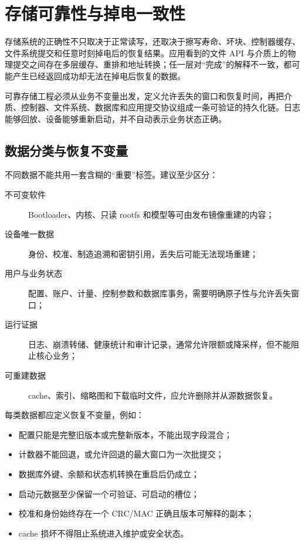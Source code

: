 \chapter{存储可靠性与掉电一致性}
\label{chap:storage-reliability}

存储系统的正确性不只取决于正常读写，还取决于擦写寿命、坏块、控制器缓存、文件系统提交和任意时刻掉电后的恢复结果。应用看到的文件 API 与介质上的物理提交之间存在多层缓存、重排和地址转换；任一层对“完成”的解释不一致，都可能产生已经返回成功却无法在掉电后恢复的数据。

可靠存储工程必须从业务不变量出发，定义允许丢失的窗口和恢复时间，再把介质、控制器、文件系统、数据库和应用提交协议组成一条可验证的持久化链。日志能够回放、设备能够重新启动，并不自动表示业务状态正确。

\section{数据分类与恢复不变量}

不同数据不能共用一套含糊的“重要”标签。建议至少区分：

\begin{description}
  \item[不可变软件] Bootloader、内核、只读 rootfs 和模型等可由发布镜像重建的内容；
  \item[设备唯一数据] 身份、校准、制造追溯和密钥引用，丢失后可能无法现场重建；
  \item[用户与业务状态] 配置、账户、计量、控制参数和数据库事务，需要明确原子性与允许丢失窗口；
  \item[运行证据] 日志、崩溃转储、健康统计和审计记录，通常允许限额或降采样，但不能阻止核心业务；
  \item[可重建数据] cache、索引、缩略图和下载临时文件，应允许删除并从源数据恢复。
\end{description}

每类数据都应定义恢复不变量，例如：

\begin{itemize}
  \item 配置只能是完整旧版本或完整新版本，不能出现字段混合；
  \item 计数器不能回退，或允许回退的最大窗口为一次批提交；
  \item 数据库外键、余额和状态机转换在重启后仍成立；
  \item 启动元数据至少保留一个可验证、可启动的槽位；
  \item 校准和身份始终存在一个 CRC/MAC 正确且版本可解释的副本；
  \item cache 损坏不得阻止系统进入维护或安全状态。
\end{itemize}


